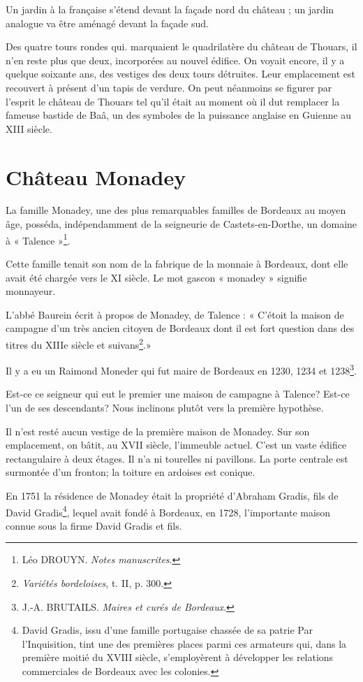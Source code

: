Un jardin à la française s'étend devant la façade nord du château ; un jardin analogue va être aménagé devant la façade sud.

Des quatre tours rondes qui. marquaient le quadrilatère du château de Thouars, il n'en reste plus que deux, incorporées au nouvel édifice. On voyait encore, il y a quelque soixante ans, des vestiges des deux tours détruites. Leur emplacement est recouvert à présent d'un tapis de verdure. On peut néanmoins se figurer par l'esprit le château de Thouars tel qu'il était au moment où il dut remplacer la fameuse bastide de Baâ, un des symboles de la puissance anglaise en Guienne au XIII\ieme{} siècle. 

\section{Château Monadey}

La famille Monadey, une des plus remarquables familles de Bordeaux au moyen âge, posséda, indépendamment de la seigneurie de Castets-en-Dorthe, un domaine à « Talence »\footnote{Léo DROUYN. \textit{Notes manuscrites}.}.

Cette famille tenait son nom de la fabrique de la monnaie à Bordeaux, dont elle avait été chargée vers le XI\ieme{} siècle. Le mot gascon « monadey » signifie monnayeur.

L'abbé Baurein écrit à propos de Monadey, de Talence : « C'étoit la maison de campagne d'un très ancien citoyen de Bordeaux dont il est fort question dans des titres du XIIIe siècle et suivans\footnote{\textit{Variétés bordeloises}, t. II, p. 300.}.»

Il y a eu un Raimond Moneder qui fut maire de Bordeaux en 1230, 1234 et 1238\footnote{J.-A. BRUTAILS. \textit{Maires et curés de Bordeaux}.}.

Est-ce ce seigneur qui eut le premier une maison de campagne à Talence? Est-ce l'un de ses descendants? Nous inclinons plutôt vers la première hypothèse.

Il n'est resté aucun vestige de la première maison de Monadey. Sur son emplacement, on bâtit, au XVII\ieme{} siècle, l'immeuble actuel. C'est un vaste édifice rectangulaire à deux étages. Il n'a ni tourelles ni pavillons. La porte centrale est surmontée d'un fronton; la toiture en ardoises est conique.

En 1751 la résidence de Monadey était la propriété d'Abraham Gradis, fils de David Gradis\footnote{David Gradis, issu d'une famille portugaise chassée de sa patrie Par l'Inquisition, tint une des premières places parmi ces armateurs qui, dans la première moitié du XVIII\ieme{} siècle, s'employèrent à développer les relations commerciales de Bordeaux avec les colonies.}, lequel avait fondé à Bordeaux, en 1728, l'importante maison connue sous la firme David Gradis et fils.

